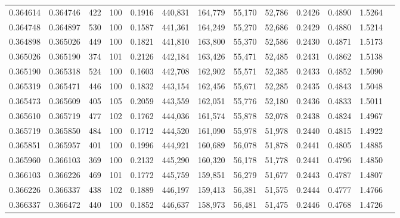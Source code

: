 \begin{tabular}{rrrrrrrrrrrrr}
0.364614 & 0.364746 &   422 & 100 &                                     0.1916 & 440,831 & 164,779 &  55,170 &  52,786 & 0.2426 & 0.4890 & 1.5264 \\
0.364748 & 0.364897 &   530 & 100 &                                     0.1587 & 441,361 & 164,249 &  55,270 &  52,686 & 0.2429 & 0.4880 & 1.5214 \\
0.364898 & 0.365026 &   449 & 100 &                                     0.1821 & 441,810 & 163,800 &  55,370 &  52,586 & 0.2430 & 0.4871 & 1.5173 \\
0.365026 & 0.365190 &   374 & 101 &                                     0.2126 & 442,184 & 163,426 &  55,471 &  52,485 & 0.2431 & 0.4862 & 1.5138 \\
0.365190 & 0.365318 &   524 & 100 &                                     0.1603 & 442,708 & 162,902 &  55,571 &  52,385 & 0.2433 & 0.4852 & 1.5090 \\
0.365319 & 0.365471 &   446 & 100 &                                     0.1832 & 443,154 & 162,456 &  55,671 &  52,285 & 0.2435 & 0.4843 & 1.5048 \\
0.365473 & 0.365609 &   405 & 105 &                                     0.2059 & 443,559 & 162,051 &  55,776 &  52,180 & 0.2436 & 0.4833 & 1.5011 \\
0.365610 & 0.365719 &   477 & 102 &                                     0.1762 & 444,036 & 161,574 &  55,878 &  52,078 & 0.2438 & 0.4824 & 1.4967 \\
0.365719 & 0.365850 &   484 & 100 &                                     0.1712 & 444,520 & 161,090 &  55,978 &  51,978 & 0.2440 & 0.4815 & 1.4922 \\
0.365851 & 0.365957 &   401 & 100 &                                     0.1996 & 444,921 & 160,689 &  56,078 &  51,878 & 0.2441 & 0.4805 & 1.4885 \\
0.365960 & 0.366103 &   369 & 100 &                                     0.2132 & 445,290 & 160,320 &  56,178 &  51,778 & 0.2441 & 0.4796 & 1.4850 \\
0.366103 & 0.366226 &   469 & 101 &                                     0.1772 & 445,759 & 159,851 &  56,279 &  51,677 & 0.2443 & 0.4787 & 1.4807 \\
0.366226 & 0.366337 &   438 & 102 &                                     0.1889 & 446,197 & 159,413 &  56,381 &  51,575 & 0.2444 & 0.4777 & 1.4766 \\
0.366337 & 0.366472 &   440 & 100 &                                     0.1852 & 446,637 & 158,973 &  56,481 &  51,475 & 0.2446 & 0.4768 & 1.4726 \\

\end{tabular}
